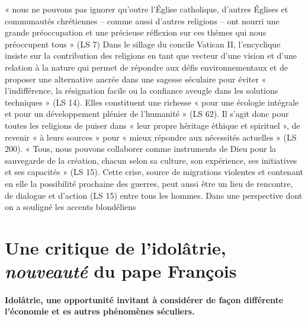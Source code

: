  \begin{singlequote}
        « nous ne pouvons pas ignorer qu’outre l’Église catholique, d’autres Églises et communautés chrétiennes – comme aussi d’autres religions – ont nourri une grande préoccupation et une précieuse réflexion sur ces thèmes qui nous préoccupent tous » (LS 7)
        Dans le sillage du concile Vatican II, l’encyclique insiste sur la contribution des religions en tant que vecteur d’une vision et d’une relation à la nature qui permet de répondre aux défis environnementaux et de proposer une alternative ancrée dans une sagesse séculaire pour éviter « l’indifférence, la résignation facile ou la confiance aveugle dans les solutions techniques » (LS 14). Elles constituent une richesse « pour une écologie intégrale et pour un développement plénier de l’humanité » (LS 62). Il s’agit donc pour toutes les religions de puiser dans « leur propre héritage éthique et spirituel », de revenir « à leurs sources » pour « mieux répondre aux nécessités actuelles » (LS 200). « Tous, nous pouvons collaborer comme instruments de Dieu pour la sauvegarde de la création, chacun selon sa culture, son expérience, ses initiatives et ses capacités » (LS 15). Cette crise, source de migrations violentes et contenant en elle la possibilité prochaine des guerres, peut aussi être un lieu de rencontre, de dialogue et d’action (LS 15) entre tous les hommes. Dans une perspective dont on a souligné les accents blondéliens 

    \end{singlequote}


\paragraph{}
\section{Une critique de l'idolâtrie, \textit{nouveauté} du pape François}


\paragraph{Idolâtrie, une opportunité invitant à considérer de façon différente l'économie et es autres phénomènes séculiers.}

